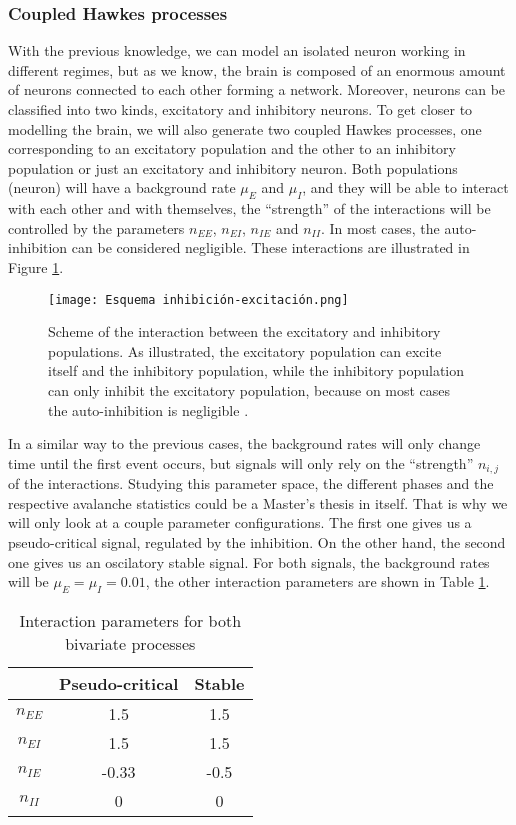 \subsubsection{Coupled Hawkes processes} \label{subsubsec:Coupled_Hawkes_processes}
With the previous knowledge, we can model an isolated neuron working in different regimes, but as we know, the brain is composed of an enormous amount of neurons connected to each 
other forming a network. Moreover, neurons can be classified into two kinds, excitatory and inhibitory neurons. To get closer to modelling the brain, we will also generate two coupled
Hawkes processes, one corresponding to an excitatory population and the other to an inhibitory population or just an excitatory and inhibitory neuron. 
Both populations (neuron) will have a background rate $\mu_E$ and $\mu_I$, and they will be able to interact with each other and with themselves, the ``strength'' of the interactions 
will be controlled by the parameters $n_{EE}$, $n_{EI}$, $n_{IE}$ and $n_{II}$. In most cases, the auto-inhibition can be considered negligible. 
These interactions are illustrated in Figure \ref{f: Hawkes coupled}.  

\begin{figure}[H]
\centering
\texttt{[image: Esquema inhibición-excitación.png]}
\caption{Scheme of the interaction between the excitatory and inhibitory populations. As illustrated, the excitatory population can excite itself and the inhibitory population, while the
inhibitory population can only inhibit the excitatory population, because on most cases the auto-inhibition is negligible \cite{kalle2018growing}.}
\label{f: Hawkes coupled}
\end{figure}

In a similar way to the previous cases, the background rates will only change time until the first event occurs, but signals will only rely on the ``strength'' $n_{i,j}$ of the interactions.
Studying this parameter space, the different phases and the respective avalanche statistics could be a Master's thesis in itself. That is why we will only look at a couple parameter 
configurations. The first one gives us a pseudo-critical signal, regulated by the inhibition. On the other hand, the second one gives us an oscilatory stable signal. For both signals, 
the background rates will be $\mu_E=\mu_I=0.01$, the other interaction parameters are shown in Table \ref{tab: Hawkes coupled parameters}.


\begin{table}[H]
    \centering
    \caption{Interaction parameters for both bivariate processes}
    \label{tab: Hawkes coupled parameters}
    \begin{tabular}{@{}ccc@{}}
    \toprule
     & \multicolumn{1}{c}{Pseudo-critical} & \multicolumn{1}{c}{Stable} \\ \midrule
    $n_{EE}$ & 1.5 & 1.5 \\
    $n_{EI}$ & 1.5 & 1.5 \\
    $n_{IE}$ & -0.33 & -0.5 \\
    $n_{II}$ & 0 & 0 \\ \bottomrule
    \end{tabular}
\end{table}

